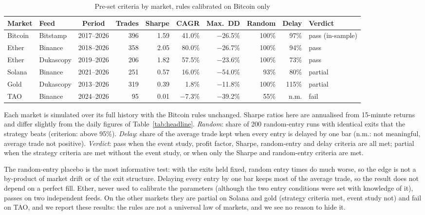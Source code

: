 \documentclass[11pt,a4paper]{article}
\newcommand{\1}{\mathbf{1}}
\begin{document}
\begin{table}[tbp]
\centering\footnotesize\setlength{\tabcolsep}{3.6pt}
\begin{threeparttable}
\caption{Pre-set criteria by market, rules calibrated on Bitcoin only}\label{tab:transfer}
\begin{tabular}{llcrrrrrrl}
\toprule
Market & Feed & Period & Trades & Sharpe & CAGR & Max.~DD & Random & Delay & Verdict \\
\midrule
Bitcoin & Bitstamp & 2017--2026 & 396 & 1.59 & 41.0\% & \ensuremath{-}26.5\% & 100\% & 97\% & pass (in-sample) \\
Ether & Binance & 2018--2026 & 358 & 2.05 & 80.0\% & \ensuremath{-}26.7\% & 100\% & 94\% & pass \\
Ether & Dukascopy & 2019--2026 & 206 & 1.82 & 57.5\% & \ensuremath{-}23.6\% & 100\% & 73\% & pass \\
Solana & Binance & 2021--2026 & 251 & 0.57 & 16.0\% & \ensuremath{-}54.0\% & 93\% & 80\% & partial \\
Gold & Dukascopy & 2013--2026 & 319 & 0.39 & 1.8\% & \ensuremath{-}11.8\% & 100\% & 115\% & partial \\
TAO & Binance & 2024--2026 & 95 & 0.01 & \ensuremath{-}7.3\% & \ensuremath{-}39.2\% & 55\% & n.m. & fail \\
\bottomrule
\end{tabular}
\begin{tablenotes}[flushleft]\footnotesize
\item Each market is simulated over its full history with the Bitcoin rules unchanged. Sharpe ratios here are annualised from 15-minute returns and differ slightly from the daily figures of Table~\ref{tab:headline}. \emph{Random}: share of 200 random-entry runs with identical exits that the strategy beats (criterion: above 95\%). \emph{Delay}: share of the average trade kept when every entry is delayed by one bar (n.m.: not meaningful, average trade not positive). \emph{Verdict}: pass when the event study, profit factor, Sharpe, random-entry and delay criteria are all met; partial when the strategy criteria are met without the event study, or when only the Sharpe and random-entry criteria are met.
\end{tablenotes}
\end{threeparttable}
\end{table}

The random-entry placebo is the most informative test: with the exits held fixed, random entry times do much worse, so the edge is not a by-product of market drift or of the exit structure. Delaying every entry by one bar keeps most of the average trade, so the result does not depend on a perfect fill. Ether, never used to calibrate the parameters (although the two entry conditions were set with knowledge of it), passes on two independent feeds. On the other markets they are partial on Solana and gold (strategy criteria met, event study not) and fail on TAO, and we report these results: the rules are not a universal law of markets, and we see no reason to hide it.
\end{document}
